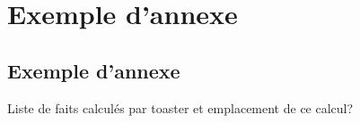 \chapter{Exemple d'annexe}
\label{chap:annexe1}

\section{Exemple d'annexe}

Liste de faits calculés par toaster et emplacement de ce calcul?